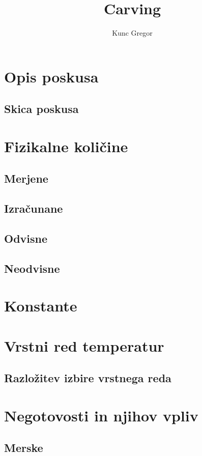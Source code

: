 \documentclass{article}
\title{Carving}
\author{Kunc Gregor}
\begin{document}
\maketitle

\section*{Opis poskusa}
\subsection*{Skica poskusa}

\section*{Fizikalne količine}
\subsection*{Merjene}
\subsection*{Izračunane}
\subsection*{Odvisne}
\subsection*{Neodvisne}

\section*{Konstante}

\section*{Vrstni red temperatur}
\subsection*{Razložitev izbire vrstnega reda}

\section*{Negotovosti in njihov vpliv}
\subsection*{Merske}
\end{document}
